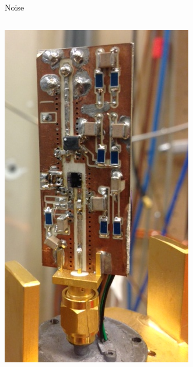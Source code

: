 \documentclass{beamer}
\begin{document}
\begin{frame}{Noise}
\begin{columns}
\includegraphics[width=\textwidth]{squid_exposed}
\end{columns}
\end{frame}
\end{document}
